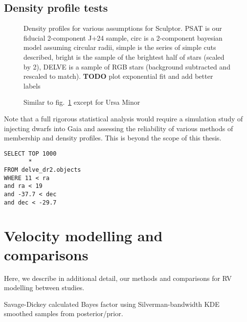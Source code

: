\subsection{Density profile tests}\label{density-profile-tests}

\begin{figure}
\centering
{}
\caption[Density profiles]{Density profiles for various assumptions for
Sculptor. PSAT is our fiducial 2-component J+24 sample, circ is a
2-component bayesian model assuming circular radii, simple is the series
of simple cuts described, bright is the sample of the brightest half of
stars (scaled by 2), DELVE is a sample of RGB stars (background
subtracted and rescaled to match). \textbf{TODO} plot exponential fit
and add better labels}\label{fig:sculptor_observed_profiles}
\end{figure}

\begin{figure}
\centering
{}
\caption[UMi Density profiles]{Similar to
fig.~\ref{fig:sculptor_observed_profiles} except for Ursa
Minor}\label{fig:umi_observed_profiles}
\end{figure}

Note that a full rigorous statistical analysis would require a
simulation study of injecting dwarfs into Gaia and assessing the
reliability of various methods of membership and density profiles. This
is beyond the scope of this thesis.

\begin{verbatim}
SELECT TOP 1000
       *
FROM delve_dr2.objects
WHERE 11 < ra
and ra < 19
and -37.7 < dec
and dec < -29.7
\end{verbatim}

\section{Velocity modelling and
comparisons}\label{velocity-modelling-and-comparisons}

Here, we describe in additional detail, our methods and comparisons for
RV modelling between studies.

Savage-Dickey calculated Bayes factor using Silverman-bandwidth KDE
smoothed samples from posterior/prior.

